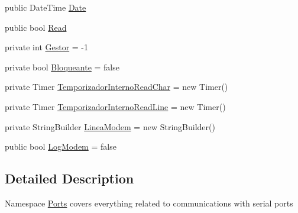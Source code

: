 \begin{DoxyCompactItemize}
public Date\-Time \hyperlink{namespaceedwinspire_1_1_ports_a506e2d03085ed736361fd15035c2e456}{Date}
\item 
public bool \hyperlink{namespaceedwinspire_1_1_ports_a4bfcb5e5e2846ac1676d0f53dff50445}{Read}
\item 
private int \hyperlink{namespaceedwinspire_1_1_ports_a5b6e04d991b7c31daba0475fc35b000e}{Gestor} = -\/1
\item 
private bool \hyperlink{namespaceedwinspire_1_1_ports_acc08a70e547bb148eb4ecf30c82dfa2e}{Bloqueante} = false
\item 
private Timer \hyperlink{namespaceedwinspire_1_1_ports_a458f577133961caebcd35a6b1e7b9322}{Temporizador\-Interno\-Read\-Char} = new Timer()
\item 
private Timer \hyperlink{namespaceedwinspire_1_1_ports_afd9c83d6beca9151b46eff2c91bc90dc}{Temporizador\-Interno\-Read\-Line} = new Timer()
\item 
private String\-Builder \hyperlink{namespaceedwinspire_1_1_ports_a0a27f70484241b1637ed57e95d4a0d26}{Linea\-Modem} = new String\-Builder()
\item 
public bool \hyperlink{namespaceedwinspire_1_1_ports_abd75369bb807e77b40ebbda7fc76eeed}{Log\-Modem} = false
\end{DoxyCompactItemize}


\subsection{Detailed Description}
Namespace \hyperlink{namespaceedwinspire_1_1_ports}{Ports} covers everything related to communications with serial ports 

